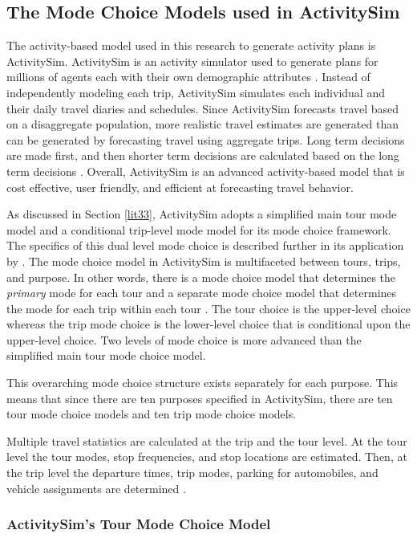 \documentclass[3p, authoryear, review]{elsarticle} %
\begin{document}
\hypertarget{lit4}{%
\subsection{The Mode Choice Models used in ActivitySim}\label{lit4}}

The activity-based model used in this research to generate activity plans is ActivitySim. ActivitySim is an activity simulator used to generate plans for millions of agents each with their own demographic attributes \citep{gali08}. Instead of independently modeling each trip, ActivitySim simulates each individual and their daily travel diaries and schedules. Since ActivitySim forecasts travel based on a disaggregate population, more realistic travel estimates are generated than can be generated by forecasting travel using aggregate trips. Long term decisions are made first, and then shorter term decisions are calculated based on the long term decisions \citep{rsg21}. Overall, ActivitySim is an advanced activity-based model that is cost effective, user friendly, and efficient at forecasting travel behavior.

As discussed in Section \ref{lit33}, ActivitySim adopts a simplified main tour mode model and a conditional trip-level mode model for its mode choice framework. The specifics of this dual level mode choice is described further in its application by \citet{mtc12}.
The mode choice model in ActivitySim is multifaceted between tours, trips, and purpose. In other words, there is a mode choice model that determines the \emph{primary} mode for each tour and a separate mode choice model that determines the mode for each trip within each tour \citep{mtc12}. The tour choice is the upper-level choice whereas the trip mode choice is the lower-level choice that is conditional upon the upper-level choice. Two levels of mode choice is more advanced than the simplified main tour mode choice model.

This overarching mode choice structure exists separately for each purpose. This means that since there are ten purposes specified in ActivitySim, there are ten tour mode choice models and ten trip mode choice models.

Multiple travel statistics are calculated at the trip and the tour level. At the tour level the tour modes, stop frequencies, and stop locations are estimated. Then, at the trip level the departure times, trip modes, parking for automobiles, and vehicle assignments are determined \citep{rsg21}.

\hypertarget{lit41}{%
\subsubsection{ActivitySim's Tour Mode Choice Model}\label{lit41}}
\end{document}
